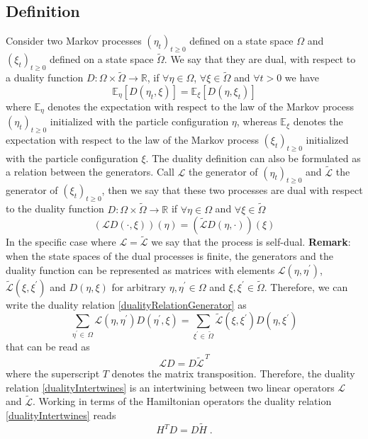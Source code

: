 \documentclass[10pt]{article}
\numberwithin{equation}{section}
\numberwithin{equation}{subsection}
\newcommand{\dt}{\;.}
\begin{document}
\subsection{Definition}
Consider two Markov processes $(\eta_{t})_{t\geq 0}$ defined on a state space $\Omega$ and $(\xi_{t})_{t\geq 0}$ defined on a state space $\widetilde{\Omega}$. We say that they are dual, with respect to a duality function $D:\Omega\times \widetilde{\Omega}\to \mathbb{R}$, if $\forall \eta\in\Omega$, $\forall \xi\in\widetilde{\Omega}$ and $\forall t> 0$ we have 
\begin{equation}\label{duality-expectation}
    \mathbb{E}_{\eta}\left[D(\eta_{t},\xi)\right]=\mathbb{E}_{\xi}\left[D(\eta,\xi_{t})\right]
\end{equation}
where $\mathbb{E}_{\eta}$ denotes the expectation with respect to the law of the Markov process $(\eta_{t})_{t\geq 0}$ initialized with the particle configuration $\eta$, whereas $\mathbb{E}_{\xi}$ denotes the expectation with respect to the law of the Markov process $(\xi_{t})_{t\geq 0}$ initialized with the particle configuration $\xi$.
The duality definition can also be formulated as a relation between the generators. Call $\mathcal{L}$ the generator of $(\eta_{t})_{t\geq0}$ and $\widetilde{\mathcal{L}}$ the generator of $(\xi_{t})_{t\geq 0}$, then we say that these two processes are dual with respect to the duality function $D:\Omega\times \widetilde{\Omega}\to \mathbb{R}$ if $\forall \eta\in\Omega$ and $\forall \xi\in\widetilde{\Omega}$
\begin{equation}\label{dualityRelationGenerator}
    \left(\mathcal{L}D(\cdot,\xi)\right)(\eta)=\left(\widetilde{\mathcal{L}}D(\eta,\cdot)\right)(\xi)
\end{equation}
In the specific case where $\mathcal{L}=\widetilde{\mathcal{L}}$ we say that the process is self-dual.
\newline
\newline
\textbf{Remark}:
when the state spaces of the dual processes is finite, the generators and the duality function can be represented as matrices with elements $\mathcal{L}(\eta,\eta^{'})$, $\widetilde{\mathcal{L}}(\xi,\xi^{'})$ and $D(\eta,\xi)$ for arbitrary $\eta,\eta^{'}\in\Omega$ and $\xi,\xi^{'}\in \widetilde{\Omega}$. Therefore, we can write the duality relation \eqref{dualityRelationGenerator} as 
\begin{equation}
    \sum_{\eta^{'}\in\,\Omega}\mathcal{L}(\eta,\eta^{'})D(\eta^{'},\xi)=\sum_{\xi^{'}\in\, \widetilde{\Omega}}\widetilde{\mathcal{L}}(\xi,\xi^{'})D(\eta,\xi^{'})
\end{equation}
that can be read as
\begin{equation}\label{dualityIntertwines}
    \mathcal{L}D=D\widetilde{\mathcal{L}}^{\,T}
\end{equation}
where the superscript $T$ denotes the matrix transposition. Therefore, the duality relation \eqref{dualityIntertwines} is an intertwining between two linear operators $\mathcal{L}$ and $\widetilde{\mathcal{L}}$. Working in terms of the Hamiltonian operators the duality relation \eqref{dualityIntertwines} reads 
\begin{equation}\label{DualityRelation}
    H^{T}D=D\widetilde{H}\dt
\end{equation}
\end{document}
